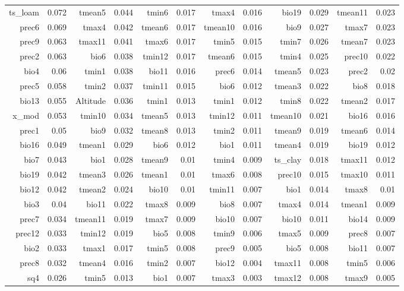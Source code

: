 \documentclass[12pt]{article}
\begin{document}
\begin{table}[htbp]
\begin{tabular}{rrrrrrrrrrrr}
    ts\_loam & 0.072 & tmean5 & 0.044 & tmin6 & 0.017 & tmax4 & 0.016 & bio19 & 0.029 & tmean11 & 0.023 \\
    prec6 & 0.069 & tmax4 & 0.042 & tmean6 & 0.017 & tmean10 & 0.016 & bio9  & 0.027 & tmax7 & 0.023 \\
    prec9 & 0.063 & tmax11 & 0.041 & tmax6 & 0.017 & tmin5 & 0.015 & tmin7 & 0.026 & tmean7 & 0.023 \\
    prec2 & 0.063 & bio6  & 0.038 & tmin12 & 0.017 & tmean6 & 0.015 & tmin4 & 0.025 & prec10 & 0.022 \\
    bio4  & 0.06  & tmin1 & 0.038 & bio11 & 0.016 & prec6 & 0.014 & tmean5 & 0.023 & prec2 & 0.02 \\
    prec5 & 0.058 & tmin2 & 0.037 & tmin11 & 0.015 & bio6  & 0.012 & tmean3 & 0.022 & bio8  & 0.018 \\
    bio13 & 0.055 & Altitude & 0.036 & tmin1 & 0.013 & tmin1 & 0.012 & tmin8 & 0.022 & tmean2 & 0.017 \\
    x\_mod & 0.053 & tmin10 & 0.034 & tmean5 & 0.013 & tmin12 & 0.011 & tmean10 & 0.021 & bio16 & 0.016 \\
    prec1 & 0.05  & bio9  & 0.032 & tmean8 & 0.013 & tmin2 & 0.011 & tmean9 & 0.019 & tmean6 & 0.014 \\
    bio16 & 0.049 & tmean1 & 0.029 & bio6  & 0.012 & bio1  & 0.011 & tmean4 & 0.019 & bio19 & 0.012 \\
    bio7  & 0.043 & bio1  & 0.028 & tmean9 & 0.01  & tmin4 & 0.009 & ts\_clay & 0.018 & tmax11 & 0.012 \\
    bio19 & 0.042 & tmean3 & 0.026 & tmean1 & 0.01  & tmax6 & 0.008 & prec10 & 0.015 & tmax10 & 0.011 \\
    bio12 & 0.042 & tmean2 & 0.024 & bio10 & 0.01  & tmin11 & 0.007 & bio1  & 0.014 & tmax8 & 0.01 \\
    bio3  & 0.04  & bio11 & 0.022 & tmax8 & 0.009 & bio8  & 0.007 & tmax4 & 0.014 & tmean1 & 0.009 \\
    prec7 & 0.034 & tmean11 & 0.019 & tmax7 & 0.009 & bio10 & 0.007 & bio10 & 0.011 & bio14 & 0.009 \\
    prec12 & 0.033 & tmin12 & 0.019 & bio5  & 0.008 & tmin9 & 0.006 & tmax5 & 0.009 & prec8 & 0.007 \\
    bio2  & 0.033 & tmax1 & 0.017 & tmin5 & 0.008 & prec9 & 0.005 & bio5  & 0.008 & bio11 & 0.007 \\
    prec8 & 0.032 & tmean4 & 0.016 & tmin2 & 0.007 & bio12 & 0.004 & tmax11 & 0.008 & tmin5 & 0.006 \\
    sq4   & 0.026 & tmin5 & 0.013 & bio1  & 0.007 & tmax3 & 0.003 & tmax12 & 0.008 & tmax9 & 0.005 \\

\end{tabular}
\end{table}
\end{document}
